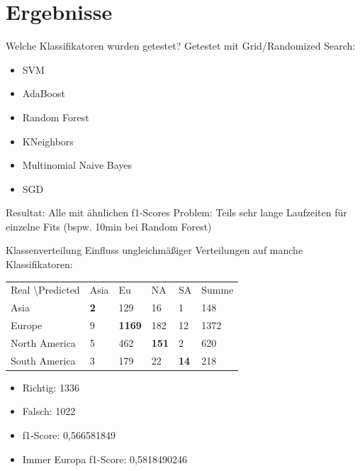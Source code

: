 \documentclass[12pt]{beamer}
\begin{document}
\section{Ergebnisse}
\begin{frame}[fragile]{Welche Klassifikatoren wurden getestet?}
Getestet mit Grid/Randomized Search:
\begin{itemize}
\item SVM 
\item AdaBoost
\item Random Forest
\item KNeighbors
\item Multinomial Naive Bayes
\item SGD
\end{itemize}

Resultat: Alle mit ähnlichen f1-Scores
Problem: Teils sehr lange Laufzeiten für einzelne Fits (bspw. 10min bei Random Forest)
\end{frame}
\begin{frame}[fragile]{Klassenverteilung}
Einfluss ungleichmäßiger Verteilungen auf manche Klassifikatoren: \\
\begin{tabular}{|l|l|l|l|l|l|}
\hline
Real \textbackslash Predicted & Asia & Eu & NA & SA & Summe\\
Asia & \textbf{2} & 129 & 16 & 1 & 148 \\
Europe & 9 & \textbf{1169} & 182 & 12 & 1372 \\
North America & 5 & 462 & \textbf{151} &2 & 620 \\
South America & 3 & 179 & 22 & \textbf{14} & 218 \\
\hline
\end{tabular}
\begin{itemize}
\item Richtig: 1336
\item Falsch: 1022
\item f1-Score: 0,566581849
\item Immer Europa f1-Score: 0,5818490246
\end{itemize}				

\end{frame}
\end{document}
